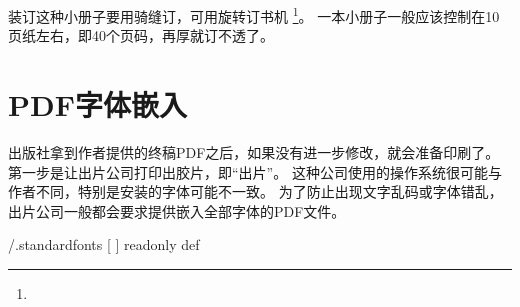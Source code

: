 装订这种小册子要用骑缝订，可用旋转订书机
\footnote{ \quad {}}。
一本小册子一般应该控制在10页纸左右，即40个页码，再厚就订不透了。

\section{PDF字体嵌入}
出版社拿到作者提供的终稿PDF之后，如果没有进一步修改，就会准备印刷了。
第一步是让出片公司打印出胶片，即“出片”。
这种公司使用的操作系统很可能与作者不同，特别是安装的字体可能不一致。
为了防止出现文字乱码或字体错乱，出片公司一般都会要求提供嵌入全部字体的PDF文件。

\begin{Codex}[label=/usr/share/ghostscript/???/Resource/Init/gs_pdfwr.ps]
/.standardfonts [
] readonly def
\end{Codex}
